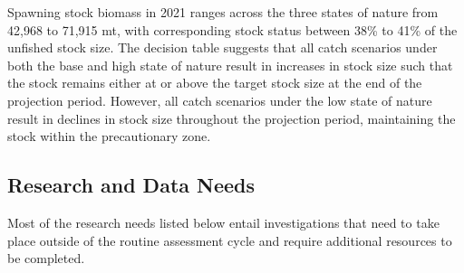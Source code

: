 \documentclass[11pt,
  english,
  a4paper,
]{article}
\begin{document}
\leavevmode\tagmcend\tagstructend\par


Spawning stock biomass in 2021 ranges across the three states of nature from 42,968 to 71,915 mt, with corresponding stock status between 38\% to 41\% of the unfished stock size. The decision table suggests that all catch scenarios under both the base and high state of nature result in increases in stock size such that the stock remains either at or above the target stock size at the end of the projection period. However, all catch scenarios under the low state of nature result in declines in stock size throughout the projection period, maintaining the stock within the precautionary zone.

\leavevmode\tagmcend\tagstructend\par


\hypertarget{research-and-data-needs}{%
\subsection*{Research and Data Needs}\label{research-and-data-needs}}

\leavevmode\tagmcend\tagstructend


Most of the research needs listed below entail investigations that need to take place outside of the routine assessment cycle and require additional resources to be completed.

\leavevmode\tagmcend\tagstructend\par

\end{document}
